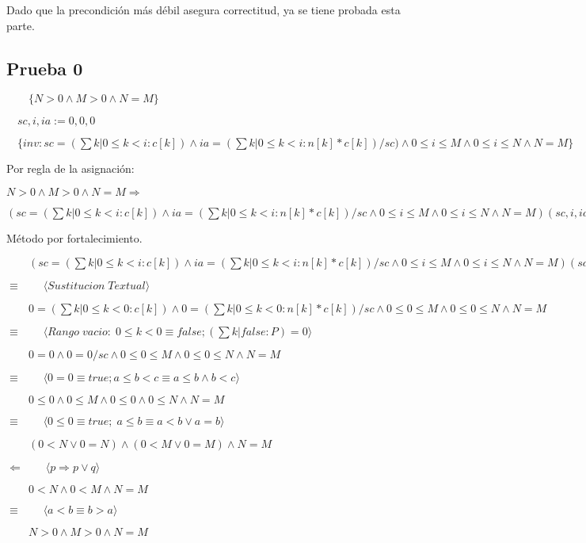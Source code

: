\documentclass{article}
\begin{document}
Dado que la precondición más débil asegura correctitud, ya se tiene probada esta parte.

\newpage

\subsection*{Prueba 0}
$\qquad \{N>0 \land M>0 \land N=M \}$\par
$\quad sc, i, ia := 0,0,0$\par
$\quad \{inv: sc=(\sum k|0 \leq k < i: c[k]) \land ia=(\sum k|0 \leq k < i: n[k]*c[k])/sc)\land 0 \leq i \leq M \land 0 \leq i \leq N \land N=M \}$

Por regla de la asignación:

$N>0 \land M>0 \land N=M \Rightarrow$\par 
$(sc=(\sum k|0 \leq k < i: c[k]) \land ia=(\sum k|0 \leq k < i: n[k]*c[k])/sc\land 0 \leq i \leq M \land 0 \leq i \leq N \land N=M)(sc, i, ia := 0,0,0)$

Método por fortalecimiento.\par 

$\qquad (sc=(\sum k|0 \leq k < i: c[k]) \land ia=(\sum k|0 \leq k < i: n[k]*c[k])/sc\land 0 \leq i \leq M \land 0 \leq i \leq N \land N=M)(sc, i, ia := 0,0,0)$\par
$\equiv  \qquad \langle Sustitucion \; Textual \rangle$\par
$\qquad 0=(\sum k|0 \leq k < 0: c[k]) \land 0=(\sum k|0 \leq k < 0: n[k]*c[k])/sc\land 0 \leq 0 \leq M \land 0 \leq 0 \leq N \land N=M$\par 
$\equiv  \qquad \langle Rango \; vacio: \; 0 \leq k < 0 \equiv false; (\sum k|false: P) = 0 \rangle$\par
$\qquad 0=0 \land 0=0/sc\land 0 \leq 0 \leq M \land 0 \leq 0 \leq N \land N=M$\par 
$\equiv  \qquad \langle 0=0 \equiv true; a \leq b < c \equiv a \leq b \land b < c \rangle$\par 
$\qquad 0 \leq 0 \land 0 \leq M \land 0 \leq 0 \land 0 \leq N \land N=M$\par 
$\equiv  \qquad \langle 0 \leq 0 \equiv true; \;  a \leq b \equiv a < b \lor a = b \rangle$\par 
$\qquad (0 < N \lor 0 = N) \land (0 < M \lor 0 = M) \land N=M $\par 
$\Leftarrow  \qquad \langle p \Rightarrow p \lor q \rangle$\par 
$\qquad 0 < N \land 0 < M \land N=M $\par 
$\equiv  \qquad \langle a<b \equiv b>a \rangle$\par 
$\qquad N>0 \land M>0 \land N=M $\par 
\end{document}
